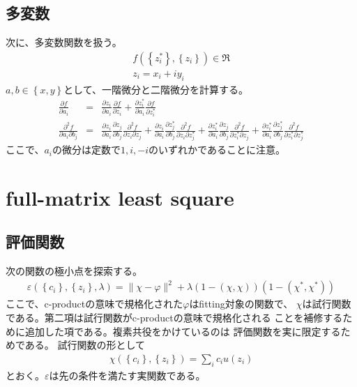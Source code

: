 \documentclass[a4paper]{jsarticle}
\def\braces#1{\left( #1 \right)}
\def\bracem#1{\left\{ #1 \right\}}
\begin{document}
\subsection{多変数}

次に、多変数関数を扱う。
\begin{eqnarray}
  f(\bracem{z_i^*}, \bracem{z_i}) \in \Re \\
  z_i = x_i + i y_i
\end{eqnarray}
$a,b\in\bracem{x,y}$として、一階微分と二階微分を計算する。
\begin{eqnarray}
  \frac{\partial f}{\partial a_i} &=&
  \frac{\partial z_i}{\partial a_i} \frac{\partial f}{\partial z_i} + \frac{\partial z_i^*}{\partial a_i} \frac{\partial f}{\partial z_i^*} \\
  \frac{\partial^2 f}{\partial a_i \partial b_j} &=&
  \frac{\partial z_i}{\partial a_i}\frac{\partial z_j}{\partial b_j} \frac{\partial^2 f}{\partial z_i \partial z_j}  +
  \frac{\partial z_i}{\partial a_i}\frac{\partial z_j^*}{\partial b_j}\frac{\partial^2 f}{\partial z_i \partial z_j^*} +
  \frac{\partial z_i^*}{\partial a_i}\frac{\partial z_j}{\partial b_j}\frac{\partial^2 f}{\partial z_i^* \partial z_j} +
  \frac{\partial z_i^*}{\partial a_i}\frac{\partial z_j^*}{\partial b_j}\frac{\partial^2 f}{\partial z_i^* \partial z_j^*} 
\end{eqnarray}
ここで、$a_i$の微分は定数で$1,i,-i$のいずれかであることに注意。


\section{full-matrix least square}
\subsection{評価関数}

次の関数の極小点を探索する。
\begin{eqnarray}
  \varepsilon \braces{\bracem{c_i}, \bracem{z_i}, \lambda} = \|\chi-\varphi\|^2 + \lambda (1-\braces{\chi, \chi})(1-\braces{\chi^*, \chi^*})
\end{eqnarray}
ここで、c-productの意味で規格化された$\varphi$はfitting対象の関数で、
$\chi$は試行関数である。第二項は試行関数がc-productの意味で規格化される
ことを補修するために追加した項である。複素共役をかけているのは
評価関数を実に限定するためである。
試行関数の形として
\begin{eqnarray}
  \chi(\bracem{c_i}, \bracem{z_i})=\sum_i c_i u(z_i)
\end{eqnarray}
とおく。$\varepsilon$は先の条件を満たす実関数である。
\end{document}

